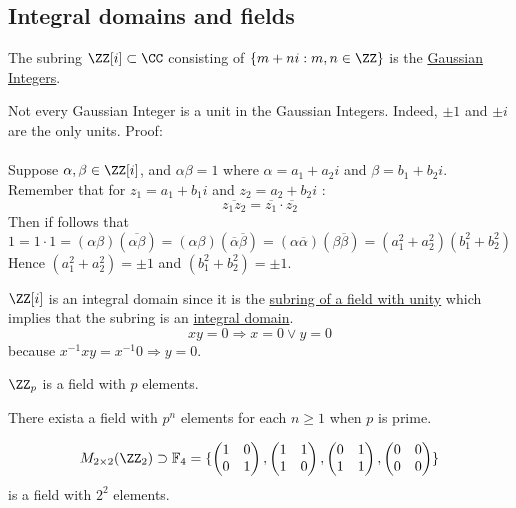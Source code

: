\documentclass[class=scrartcl, crop=false]{standalone}
\begin{document}
\subsection{Integral domains and fields}

\begin{definition}
  The subring $\ZZ[i] \subset \CC$ consisting of $\{m + ni: m, n \in \ZZ\}$ is the \ul{Gaussian Integers}.
  \begin{remark}
    Not every Gaussian Integer is a unit in the Gaussian Integers. Indeed, $\pm 1$ and $\pm i$ are the only units. Proof:
    \\\\
    Suppose $\alpha, \beta \in \ZZ[i]$, and $\alpha\beta = 1$ where $\alpha = a_1 + a_2i$ and $\beta = b_1 + b_2i$. Remember that for $z_1 = a_1 + b_1i$ and $z_2 = a_2 + b_2i$ :
    \[
      \overline{z_1z_2} = \overline{z_1}\cdot\overline{z_2}
    \]
    Then if follows that
    \[
      1 = 1 \cdot 1 = (\alpha\beta)(\overline{\alpha\beta}) = (\alpha\beta)(\overline{\alpha}\overline{\beta}) = (\alpha\overline{\alpha})(\beta\overline{\beta}) = (a_1^2 + a_2^2)(b_1^2 + b_2^2)
    \]
    Hence $(a_1^2 + a_2^2) = \pm 1$ and $(b_1^2 + b_2^2) = \pm 1$. 
  \end{remark} \noindent
  $\ZZ[i]$ is an integral domain since it is the \ul{subring of a field with unity} which implies that the subring is an \ul{integral domain}.
  \[
    xy = 0 \Rightarrow x = 0 \vee y = 0
  \]
  because $x^{-1}xy = x^{-1} 0 \Rightarrow y = 0$.
\end{definition} 
\begin{example}
  $\ZZ_p$ is a field with $p$ elements.
\end{example} 
\begin{theorem}
  There exista a field with $p^n$ elements for each $n \geq 1$ when $p$ is prime.
\end{theorem} 
\begin{example}
  \[
    M_{2 \times 2}(\ZZ_2) \supset \mathbb{F}_4 =
    \{
      \begin{pmatrix}
        1 & 0 \\
        0 & 1
      \end{pmatrix} ,
      \begin{pmatrix}
        1 & 1 \\
        1 & 0
      \end{pmatrix} ,
      \begin{pmatrix}
        0 & 1 \\
        1 & 1
      \end{pmatrix} ,
      \begin{pmatrix}
        0 & 0 \\
        0 & 0
      \end{pmatrix} 
    \}
  \]
  is a field with $2^2$ elements. 
\end{example} 
\end{document}

